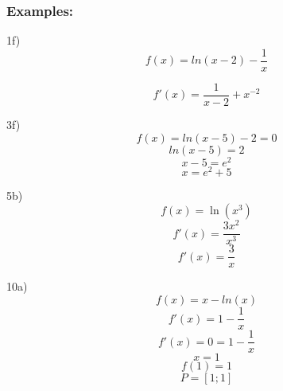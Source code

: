 \documentclass{scrbook}
\begin{document}
\subsubsection {Examples:}

1f)
\[f(x) = ln(x-2) - \frac 1 x\]

\[f'(x) = \frac 1 {x-2} + x^{-2}\]

3f)
\[f(x) = ln(x-5) - 2 = 0\]
\[ln(x-5) = 2\]
\[x-5 = e^2\]
\[x = e^2+5\]

5b)
\[f(x) = \ln (x^3)\]
\[f'(x) = \frac {3x^2} {x^3}\]
\[f'(x) = \frac 3 x\] 

10a)
\[f(x) = x - ln(x)\]
\[f'(x) = 1- \frac 1x\]
\[f'(x) = 0 = 1- \frac 1x\]
\[x = 1\]
\[f(1) = 1\]
\[P = [1; 1]\]
\end{document}
